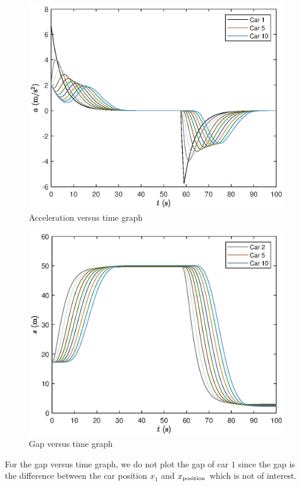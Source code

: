 \documentclass[12pt]{article}
\begin{document}
      \begin{figure}[H]
      \includegraphics[width=13cm]{HomogeneousTraffic3.eps}
      \centering
      \caption{Acceleration versus time graph}
      \end{figure}

      \begin{figure}[H]
      \includegraphics[width=13cm]{HomogeneousTraffic4.eps}
      \centering
      \caption{Gap versus time graph}
      \end{figure}
      
      For the gap versus time graph, we do not plot the gap of car $1$ since the gap is the difference between the car position $x_1$ and $x_{\rm position}$ which is not of interest. 
\end{document}
